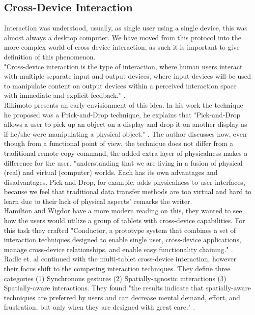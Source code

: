 \subsection{Cross-Device Interaction}

Interaction was understood, usually, as single user using a single device, this was almost always a desktop computer\cite{Levin:2014}. We have moved from this protocol into the more complex world of cross device interaction, as such it is important to give definition of this phenomenon.\\
"Cross-device interaction is the type of interaction, where human users interact with multiple separate input and output devices, where input devices will be used to manipulate content on output devices within a perceived interaction space with immediate and explicit feedback." \cite{Scharf:2013}.\\
Rikimoto presents an early envisionment of this idea. In his work the technique he proposed was a Prick-and-Drop technique, he explains that "Pick-and-Drop allows a user to pick up an object on a display and drop it on another display as if he/she were manipulating a physical object." \cite{Rekimoto:1997}. The author discusses how, even though from a functional point of view, the technique does not differ from a traditional remote copy command, the added extra layer of physicalness makes a difference for the user. "understanding that we are living in a fusion of physical (real) and virtual (computer) worlds. Each has its own advantages and disadvantages. Pick-and-Drop, for example, adds physicalness to user interfaces, because we feel that traditional data transfer methods are too virtual and hard to learn due to their lack of physical aspects" \cite{Rekimoto:1997} remarks the writer.\\
Hamilton and Wigdor have a more modern reading on this, they wanted to see how the users would utilize a group of tablets with cross-device capabilities. For this task they crafted "Conductor, a prototype system that combines a set of interaction techniques designed to enable single user, cross-device applications, manage cross-device relationships, and enable easy functionality chaining." \cite{Hamilton:2014}.\\
Radle et. al continued with the multi-tablet cross-device interaction, however their focus shift to the competing interaction techniques. They define three categories (1) Synchronous gestures (2) Spatially-agnostic interactions (3) Spatially-aware interactions. They found "the results indicate that spatially-aware techniques are preferred by users and can decrease mental demand, effort, and frustration, but only when they are designed with great care." \cite{Radle:2015}.\\
